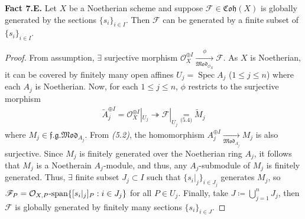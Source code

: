 \documentclass[11pt,a4paper,footinclude=true,headinclude=true]{scrbook} %
\DeclareMathOperator{\Spec}{Spec}
\newcommand{\FF}{\mathscr{F}}
\newcommand{\OO}{\mathcal{O}}
\newcommand{\<}{\langle}
\newcommand{\>}{\rangle}
\newcommand{\spn}{\mathchar`-\mathrm{span}}
\newcommand{\fg}{\mathfrak{f.g.}}
\newcommand{\MOD}{\mathfrak{Mod}}
\newcommand{\coh}{\mathfrak{Coh}}
\newenvironment{fact}[2][Fact]
    { \begin{mdframed}[backgroundcolor=gray!20] \textbf{#1 #2.} }
    {  \end{mdframed}}
\begin{document}
\begin{fact}{7.E}
    Let $X$ be a Noetherian scheme and suppose $\FF\in\coh(X)$ is globally generated by the sections $\{s_i\}_{i\in I}$. Then $\FF$ can be generated by a finite subset of $\{s_i\}_{i\in I}$.
\end{fact}
\begin{proof}
    From assumption, $\exists$ surjective morphism $\OO_X^{\oplus I}\xrightarrow[\MOD_{\OO_X}]{\phi}\FF$. As $X$ is Noetherian, it can be covered by finitely many open affines $U_j=\Spec A_j$ ($1\leq j\leq n$) where each $A_j$ is Noetherian. Now, for each $1\leq j\leq n$, $\phi$ restricts to the surjective morphism
    \begin{align*}
        \widetilde{A}_j^{\oplus I}=\OO_X^{\oplus I}|_{U_j}\twoheadrightarrow\FF|_{U_j}\underset{\text{(5.4)}}{=}\widetilde{M}_j
    \end{align*}
    where $M_j\in\fg\MOD_{A_j}$. From \textit{(5.2)}, the homomorphism $A_j^{\oplus I}\xrightarrow[\MOD_{A_j}]{}M_j$ is also surjective. Since $M_j$ is finitely generated over the Noetherian ring $A_j$, it follows that $M_j$ is a Noetherain $A_j$-module, and thus, any $A_j$-submodule of $M_j$ is finitely generated. Thus, $\exists$ finite subset $J_j\subset I$ such that $\{s_i|_j\}_{i\in J_j}$ generates $M_j$, so $\FF_P=\OO_{X,P}\spn\{[s_i|_j]_P:i\in J_j\}$ for all $P\in U_j$. Finally, take $J\coloneqq\bigcup_{j=1}^nJ_j$, then $\FF$ is globally generated by finitely many sections $\{s_i\}_{i\in J}$.
\end{proof}
\end{document}
